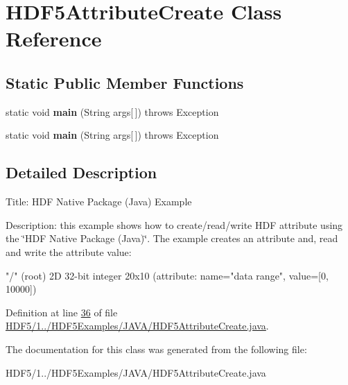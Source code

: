 \hypertarget{class_h_d_f5_attribute_create}{}\section{H\+D\+F5\+Attribute\+Create Class Reference}
\label{class_h_d_f5_attribute_create}
\subsection*{Static Public Member Functions}
\begin{DoxyCompactItemize}
\item 
\mbox{\label{class_h_d_f5_attribute_create_a51f663fea168d1c28f4e6fe35dbb3be3}} 
static void {\bfseries main} (String args\mbox{[}$\,$\mbox{]})  throws Exception 
\item 
\mbox{\label{class_h_d_f5_attribute_create_a51f663fea168d1c28f4e6fe35dbb3be3}} 
static void {\bfseries main} (String args\mbox{[}$\,$\mbox{]})  throws Exception 
\end{DoxyCompactItemize}


\subsection{Detailed Description}
Title\+: H\+DF Native Package (Java) Example 

Description\+: this example shows how to create/read/write H\+DF attribute using the \char`\"{}\+H\+D\+F Native Package (\+Java)\char`\"{}. The example creates an attribute and, read and write the attribute value\+:


\begin{DoxyPre}
    "/" (root)
            2D 32-bit integer 20x10
            (attribute: name="data range", value=[0, 10000])
\end{DoxyPre}


Definition at line \hyperlink{_h_d_f5_21_810_81_2_h_d_f5_examples_2_j_a_v_a_2_h_d_f5_attribute_create_8java_source_l00036}{36} of file \hyperlink{_h_d_f5_21_810_81_2_h_d_f5_examples_2_j_a_v_a_2_h_d_f5_attribute_create_8java_source}{H\+D\+F5/1../\+H\+D\+F5\+Examples/\+J\+A\+V\+A/\+H\+D\+F5\+Attribute\+Create.\+java}.



The documentation for this class was generated from the following file\+:\begin{DoxyCompactItemize}
\item 
H\+D\+F5/1../\+H\+D\+F5\+Examples/\+J\+A\+V\+A/\+H\+D\+F5\+Attribute\+Create.\+java\end{DoxyCompactItemize}
